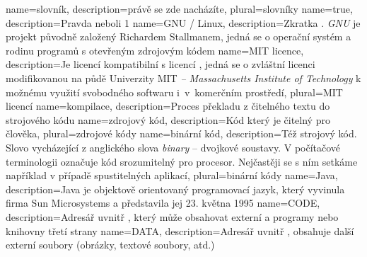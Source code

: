 {
  name={slovník},
  description={právě se zde nacházíte},
  plural={slovníky}
}
{
  name={true},
  description={Pravda neboli 1}
}
{
  name={GNU / Linux},
  description={Zkratka . {\em GNU} je projekt původně založený Richardem Stallmanem, jedná se o operační systém a rodinu programů s otevřeným zdrojovým kódem}
}
{
  name={MIT licence},
  description={Je licencí kompatibilní s licencí , jedná se o zvláštní licenci modifikovanou na půdě Univerzity MIT {\em -- Massachusetts \linebreak Institute of Technology} k možnému využití svobodného softwaru i~v~komerčním prostředí},
  plural={MIT licencí}
}
{
	name={kompilace},
	description={Proces překladu z čitelného textu do strojového kódu}
}
{
	name={zdrojový kód},
	description={Kód který je čitelný pro člověka},
	plural={zdrojové kódy}
}
{
	name={binární kód},
	description={Též strojový kód. Slovo vycházející z anglického slova {\em binary} -- dvojkové soustavy. V počítačové terminologii označuje kód srozumitelný pro procesor. Nejčastěji se s ním setkáme například v případě spustitelných aplikací},
	plural={binární kódy}
}
{
	name={Java},
	description={Java je objektově orientovaný programovací jazyk, který vyvinula firma Sun Microsystems a představila jej 23. května 1995}
}
{
	name={CODE},
	description={Adresář uvnitř , který může obsahovat externí  a  programy nebo knihovny třetí strany}
}
{
	name={DATA},
	description={Adresář uvnitř , obsahuje další externí soubory (obráz\-ky, textové soubory, atd.)}
}


